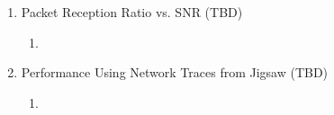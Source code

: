 \begin{enumerate}
    \item Packet Reception Ratio vs. SNR (TBD)
    \begin{enumerate}
        \item <Figure TBD>
    \end{enumerate}

    \item Performance Using Network Traces from Jigsaw (TBD)
    \begin{enumerate}
        \item <Figure TBD>
    \end{enumerate}
\end{enumerate}





